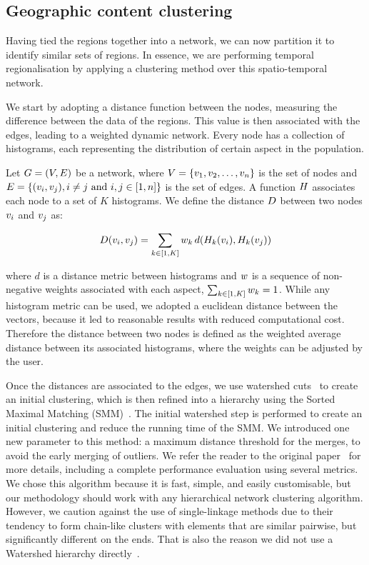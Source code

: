 \subsection{Geographic content clustering}
Having tied the regions together into a network, we can now partition it to
identify similar sets of regions. In essence, we are performing
temporal regionalisation by applying a clustering method over this
spatio-temporal network.

We start by adopting a distance function between the nodes, measuring the
difference between the data of the regions. This value is then associated with
the edges, leading to a weighted dynamic network. Every node has a collection of
histograms, each representing the distribution of certain aspect in the
population.

Let $G=(V,E)$ be a network, where
$V=\{v_1,v_2,\dots,v_n\}$ is the set of nodes and
$E=\{(v_i,v_j), i\not=j\text{ and }i,j \in [1,n]\}$ is the set of
edges. A function $H$ associates each node to a set of $K$ histograms. We
define the distance $D$ between two nodes $v_i$ and $v_j$ as:

\begin{equation}
    D(v_i,v_j)=\sum_{k \in [1,K]}{w_k\, d(H_k(v_i),H_k(v_j))}
    \label{eq:dist}
\end{equation}

\noindent where $d$ is a distance metric between histograms and $w$ is a
sequence of non-negative weights associated with each aspect,
$\sum_{k\in[1,K]}{w_k}=1$. While any histogram metric can be used, we
adopted a euclidean distance between the vectors, because it led to reasonable
results with reduced computational cost. Therefore the distance between two
nodes is defined as the weighted average distance between its associated
histograms, where the weights can be adjusted by the user.

Once the distances are associated to the edges, we use watershed
cuts~\citep{Cousty2009} to create an initial clustering, which is then refined
into a hierarchy using the Sorted Maximal Matching (SMM)~\citep{markus2017}. The
initial watershed step is performed to create an initial clustering and reduce
the running time of the SMM. We introduced one new parameter to this method: a
maximum distance threshold for the merges, to avoid the early merging of
outliers. We refer the reader to the original paper~\citep{markus2017} for more
details, including a complete performance evaluation using several metrics. We
chose this algorithm because it is fast, simple, and easily customisable, but
our methodology should work with any hierarchical network clustering algorithm.
However, we caution against the use of single-linkage methods due to their
tendency to form chain-like clusters with elements that are similar pairwise,
but significantly different on the ends. That is also the reason we did not use
a Watershed hierarchy directly~\citep{najman2011equivalence}.



